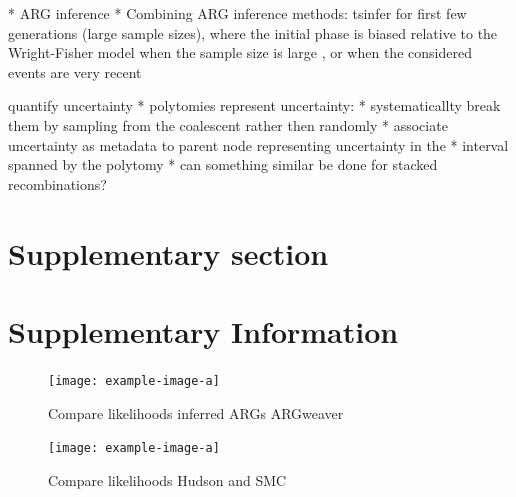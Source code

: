 \documentclass{article}
\newcommand{\supplementarysection}{%
  \setcounter{figure}{0}%
  \let\oldthefigure\thefigure%
  \renewcommand{\thefigure}{S\oldthefigure}%
  \section{Supplementary section}%
}
\begin{document}
* ARG inference *
Combining ARG inference methods: tsinfer for first few generations (large sample sizes), where 
the initial phase is biased relative to the Wright-Fisher model when the sample size is large 
\citep{bhaskar_distortion_2014}, or when the considered events are very recent \citep{wakeley_gene_2012}



quantify uncertainty
* polytomies represent uncertainty:
*  systematicallty break them by sampling from the coalescent rather then randomly
* associate uncertainty as metadata to parent node representing uncertainty in the
* interval spanned by the polytomy
* can something similar be done for stacked recombinations?







\pagebreak 

\supplementarysection
\section*{Supplementary Information}


\begin{figure}[!ht]
\centering
\texttt{[image: example-image-a]}
\caption{Compare likelihoods inferred ARGs ARGweaver}
 \label{sup:fig:vs-argweaver}
\end{figure}


\begin{figure}[!ht]
\centering
\texttt{[image: example-image-a]}
\caption{Compare likelihoods Hudson and SMC}
\label{sup:fig:vs-hudson}
\end{figure}
\end{document}
